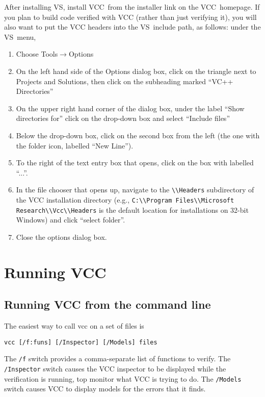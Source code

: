 After installing VS, install VCC\ from the installer link on the
VCC\ homepage. If you plan to build code verified with VCC (rather
than just verifying it), you will also want to put the VCC headers
into the VS\ include path, as follows: under the VS\ menu, 
\begin{enumerate}
\item Choose Tools$\rightarrow$Options
\item On the left hand side of the Options dialog box, click on the
  triangle next to Projects and Solutions, then click on the
  subheading marked ``VC++ Directories''
\item On the upper right hand corner of the dialog box, under the
  label ``Show directories for'' click on the drop-down box and select
  ``Include files''
\item Below the drop-down box, click on the second box from the left
  (the one with the folder icon, labelled ``New Line'').
\item To the right of the text entry box that opens, click on the box
  with labelled ``...''.
\item In the file chooser that opens up, navigate to the \verb!\\Headers!
  subdirectory of the VCC installation directory (e.g., \verb!C:\\Program Files\\Microsoft Research\\Vcc\\Headers! is the default location for
  installations on 32-bit Windows) and click ``select folder''.
\item Close the options dialog box.
\end{enumerate}

\section{Running VCC}
\subsection{Running VCC from the command line}
The easiest way to call vcc on a set of files is
\begin{verbatim}
vcc [/f:funs] [/Inspector] [/Models] files
\end{verbatim}
The \verb!/f! switch provides a comma-separate list of functions to
verify. The \verb!/Inspector! switch causes the VCC inspector to be
displayed while the verification is running, top monitor what VCC is
trying to do. The \verb!/Models! switch causes VCC to display models for
the errors that it finds.
 
